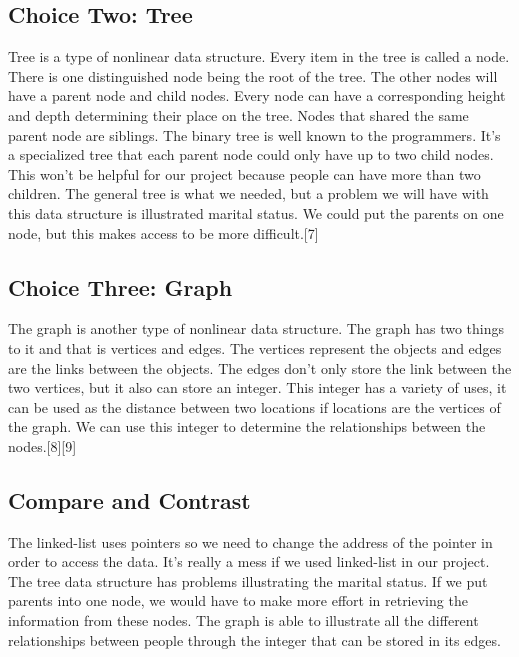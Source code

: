 \documentclass[onecolumn, draftclsnofoot, 10pt, compsoc]{IEEEtran}
\begin{document}
\subsection{Choice Two: Tree}
\begin{singlespace}
Tree is a type of nonlinear data structure. Every item in the tree is called a node. There is one distinguished node being the root of the tree. The other nodes will have a parent node and child nodes. Every node can have a corresponding height and depth determining their place on the tree. Nodes that shared the same parent node are siblings. The binary tree is well known to the programmers. It's a specialized tree that each parent node could only have up to two child nodes. This won't be helpful for our project because people can have more than two children. The general tree is what we needed, but a problem we will have with this data structure is illustrated marital status. We could put the parents on one node, but this makes access to be more difficult.[7]
\end{singlespace}
 

\subsection{Choice Three: Graph}
\begin{singlespace}
The graph is another type of nonlinear data structure. The graph has two things to it and that is vertices and edges. The vertices represent the objects and edges are the links between the objects. The edges don't only store the link between the two vertices, but it also can store an integer. This integer has a variety of uses, it can be used as the distance between two locations if locations are the vertices of the graph. We can use this integer to determine the relationships between the nodes.[8][9] 
\end{singlespace}

\subsection{Compare and Contrast}
\begin{singlespace}
The linked-list uses pointers so we need to change the address of the pointer in order to access the data. It's really a mess if we used linked-list in our project. The tree data structure has problems illustrating the marital status. If we put parents into one node, we would have to make more effort in retrieving the information from these nodes. The graph is able to illustrate all the different relationships between people through the integer that can be stored in its edges. 
\end{singlespace}
\end{document}
